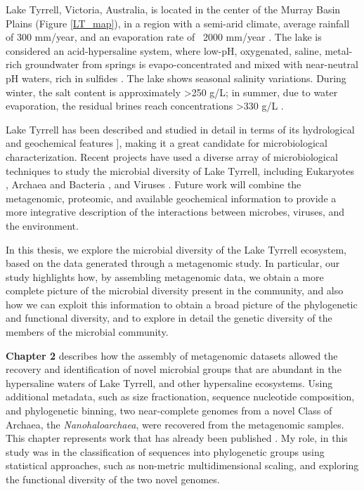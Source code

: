 Lake Tyrrell, Victoria, Australia, is located in the center of the Murray Basin Plains (Figure \ref{LT_map}), in a region with a semi-arid climate, average rainfall of 300 mm/year, and an evaporation rate of ~2000 mm/year  \cite{Macumber:1992ty}. The lake is considered an acid-hypersaline system, where low-pH, oxygenated, saline, metal-rich groundwater from springs is evapo-concentrated and mixed with near-neutral pH waters, rich in sulfides \cite{Long:1992ie}. The lake shows seasonal salinity variations. During winter, the salt content is approximately  \textgreater 250 g/L; in summer, due to water evaporation, the residual brines reach concentrations \textgreater 330 g/L \cite{Macumber:1992ty}.

Lake Tyrrell has been described and studied in detail in terms of its hydrological and geochemical features  \cite{Long:1992ie,Macumber:1992ty,Jones:2006jn}], making it a great candidate for microbiological characterization. Recent projects have used a diverse array of microbiological techniques to study the microbial diversity of Lake Tyrrell, including Eukaryotes \cite{KarlaBHeidelberg:2013jc}, Archaea and Bacteria \cite{Podell:2013kx,Narasingarao:2012kp,Ugalde:2013hb}, and Viruses \cite{Emerson:2012gh,Emerson:tk}. Future work will combine the metagenomic, proteomic, and available geochemical information to provide a more integrative description of the interactions between microbes, viruses, and the environment. 

In this thesis, we explore the microbial diversity of the Lake Tyrrell ecosystem, based on the data generated through a metagenomic study. In particular, our study highlights how, by assembling metagenomic data, we obtain a more complete picture of the microbial diversity present in the community, and also how we can exploit this information to obtain a broad picture of the phylogenetic and functional diversity, and to explore in detail the genetic diversity of the members of the microbial community.

\textbf{Chapter 2} describes how the assembly of metagenomic datasets allowed the recovery and identification of novel microbial groups that are abundant in the hypersaline waters of Lake Tyrrell, and other hypersaline ecosystems. Using additional metadata, such as size fractionation, sequence nucleotide composition, and phylogenetic binning, two near-complete genomes from a novel Class of Archaea, the \textit{Nanohaloarchaea}, were recovered from the metagenomic samples. This chapter represents work that has already been published  \cite{Narasingarao:2012kp}. My role, in this study was in the classification of sequences into phylogenetic groups using statistical approaches, such as non-metric multidimensional scaling, and exploring the functional diversity of the two novel genomes.

